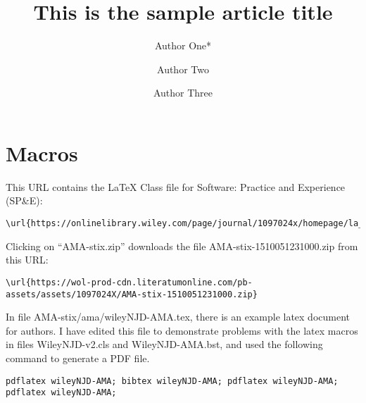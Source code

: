 \documentclass[AMA,STIX1COL]{WileyNJD-v2}
\begin{document}
\title{This is the sample article title}

\author[1]{Author One*}
\author[2,3]{Author Two}
\author[3]{Author Three}



\address[1]{, , }
\address[2]{, , }
\address[3]{, , }





\maketitle


\section{Macros}

This URL contains the LaTeX Class file for Software: Practice and Experience (SP\&E):
\begin{verbatim}
\url{https://onlinelibrary.wiley.com/page/journal/1097024x/homepage/la_tex_class_file.htm}
\end{verbatim}
Clicking on ``AMA-stix.zip'' downloads the file AMA-stix-1510051231000.zip from this URL:
\begin{verbatim}
\url{https://wol-prod-cdn.literatumonline.com/pb-assets/assets/1097024X/AMA-stix-1510051231000.zip}
\end{verbatim}
In file AMA-stix/ama/wileyNJD-AMA.tex, there is an example latex document for authors.
I have edited this file to demonstrate problems with the latex macros in files WileyNJD-v2.cls and WileyNJD-AMA.bst, and used the following command to generate a PDF file.
\begin{verbatim}
pdflatex wileyNJD-AMA; bibtex wileyNJD-AMA; pdflatex wileyNJD-AMA; pdflatex wileyNJD-AMA;
\end{verbatim}
\end{document}
